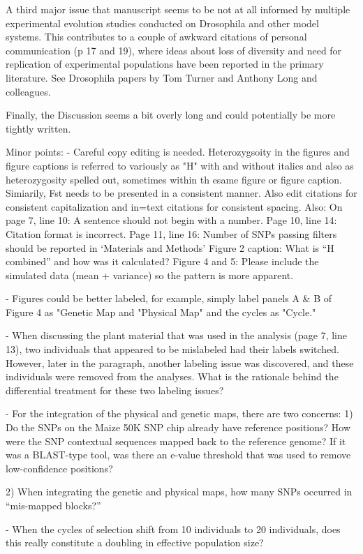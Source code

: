 \documentclass[onecolumn,oneside,letterpaper]{article}
\begin{document}
A third major issue that manuscript seems to be not at all informed by multiple experimental evolution 
studies conducted on Drosophila and other model systems. This contributes to a couple of awkward 
citations of personal communication (p 17 and 19), where ideas about loss of diversity and need for 
replication of experimental populations have been reported in the primary literature. See Drosophila papers 
by Tom Turner and Anthony Long and colleagues.

Finally, the Discussion seems a bit overly long and could potentially be more tightly written.

Minor points: 
- Careful copy editing is needed. Heterozygsoity in the figures and figure captions is referred to variously 
as "H" with and without italics and also as heterozygosity spelled out, sometimes within th esame figure or 
figure caption. Simiarily, Fst needs to be presented in a consistent manner. Also edit citations for 
consistent capitalization and in=text citations for consistent spacing. Also:
On page 7, line 10: A sentence should not begin with a number.
Page 10, line 14: Citation format is incorrect. 
Page 11, line 16: Number of SNPs passing filters should be reported in ‘Materials and Methods’
Figure 2 caption: What is “H combined” and how was it calculated?
Figure 4 and 5: Please include the simulated data (mean + variance) so the pattern is more apparent.

- Figures could be better labeled, for example, simply label panels A & B of Figure 4  as "Genetic Map and 
"Physical Map" and the cycles as "Cycle."

- When discussing the plant material that was used in the analysis (page 7, line 13), two individuals that 
appeared to be mislabeled had their labels switched. However, later in the paragraph, another labeling 
issue was discovered, and these individuals were removed from the analyses. What is the rationale behind 
the differential treatment for these two labeling issues?

- For the integration of the physical and genetic maps, there are two concerns:
1) Do the SNPs on the Maize 50K SNP chip already have reference positions? How were the SNP contextual 
sequences mapped back to the reference genome? If it was a BLAST-type tool, was there an e-value 
threshold that was used to remove low-confidence positions? 

2) When integrating the genetic and physical maps, how many SNPs occurred in “mis-mapped blocks?” 

- When the cycles of selection shift from 10 individuals to 20 individuals, does this really constitute a 
doubling in effective population size?
\end{document}
